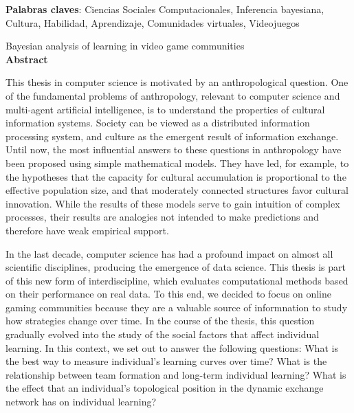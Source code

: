 \documentclass[a4paper,11pt]{book}
\theoremstyle{definition}
\newcommand{\TITULOen}[0]{Bayesian analysis of learning in video game communities}
\begin{document}
\noindent \textbf{Palabras claves}: Ciencias Sociales Computacionales, Inferencia bayesiana, Cultura, Habilidad, Aprendizaje, Comunidades virtuales, Videojuegos


\newpage


\begin{center}
\Large \TITULOen \normalsize \\[0.5cm]

\textbf{Abstract}
\end{center}


This thesis in computer science is motivated by an anthropological question.
One of the fundamental problems of anthropology, relevant to computer science and multi-agent artificial intelligence, is to understand the properties of cultural information systems.
Society can be viewed as a distributed information processing system, and culture as the emergent result of information exchange.
Until now, the most influential answers to these questions in anthropology have been proposed using simple mathematical models.
They have led, for example, to the hypotheses that the capacity for cultural accumulation is proportional to the effective population size, and that moderately connected structures favor cultural innovation.
While the results of these models serve to gain intuition of complex processes, their results are analogies not intended to make predictions and therefore have weak empirical support.


In the last decade, computer science has had a profound impact on almost all scientific disciplines, producing the emergence of data science.
This thesis is part of this new form of interdiscipline, which evaluates computational methods based on their performance on real data.
To this end, we decided to focus on online gaming communities because they are a valuable source of informnation to study how strategies change over time.
In the course of the thesis, this question gradually evolved into the study of the social factors that affect individual learning.
In this context, we set out to answer the following questions:
What is the best way to measure individual's learning curves over time?
What is the relationship between team formation and long-term individual learning?
What is the effect that an individual's topological position in the dynamic exchange network has on individual learning?

\end{document}
